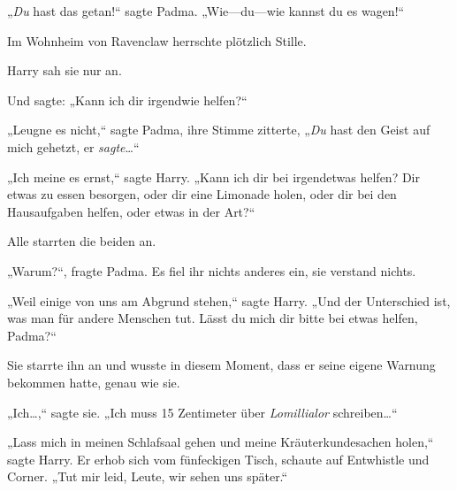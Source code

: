 „\emph{Du} hast das getan!“ sagte Padma. „Wie—du—wie kannst du es wagen!“

Im Wohnheim von Ravenclaw herrschte plötzlich Stille.

Harry sah sie nur an.

Und sagte: „Kann ich dir irgendwie helfen?“

„Leugne es nicht,“ sagte Padma, ihre Stimme zitterte, „\emph{Du} hast den Geist auf mich gehetzt, er \emph{sagte}…“

„Ich meine es ernst,“ sagte Harry. „Kann ich dir bei irgendetwas helfen? Dir etwas zu essen besorgen, oder dir eine Limonade holen, oder dir bei den Hausaufgaben helfen, oder etwas in der Art?“

Alle starrten die beiden an.

„Warum?“, fragte Padma. Es fiel ihr nichts anderes ein, sie verstand nichts.

„Weil einige von uns am Abgrund stehen,“ sagte Harry. „Und der Unterschied ist, was man für andere Menschen tut. Lässt du mich dir bitte bei etwas helfen, Padma?“

Sie starrte ihn an und wusste in diesem Moment, dass er seine eigene Warnung bekommen hatte, genau wie sie.

„Ich…,“ sagte sie. „Ich muss 15 Zentimeter über \emph{Lomillialor} schreiben…“

„Lass mich in meinen Schlafsaal gehen und meine Kräuterkundesachen holen,“ sagte Harry. Er erhob sich vom fünfeckigen Tisch, schaute auf Entwhistle und Corner. „Tut mir leid, Leute, wir sehen uns später.“

